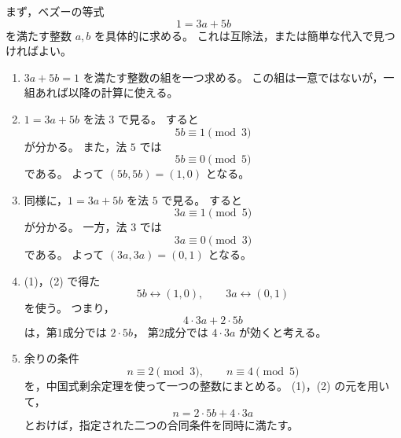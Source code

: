 \begin{strategy}
	まず，ベズーの等式
	\[
	1=3a+5b
	\]
	を満たす整数 \(a,b\) を具体的に求める。
	これは互除法，または簡単な代入で見つければよい。
	
	\begin{enumerate}
		\item[(0)]
		\(3a+5b=1\) を満たす整数の組を一つ求める。
		この組は一意ではないが，一組あれば以降の計算に使える。
		
		\item[(1)]
		\(1=3a+5b\) を法 \(3\) で見る。
		すると
		\[
		5b\equiv 1 \pmod{3}
		\]
		が分かる。
		また，法 \(5\) では
		\[
		5b\equiv 0 \pmod{5}
		\]
		である。
		よって \((5b,5b)=(1,0)\) となる。
		
		\item[(2)]
		同様に，\(1=3a+5b\) を法 \(5\) で見る。
		すると
		\[
		3a\equiv 1 \pmod{5}
		\]
		が分かる。
		一方，法 \(3\) では
		\[
		3a\equiv 0 \pmod{3}
		\]
		である。
		よって \((3a,3a)=(0,1)\) となる。
		
		\item[(3)]
		(1)，(2) で得た
		\[
		5b \leftrightarrow (1,0),
		\qquad
		3a \leftrightarrow (0,1)
		\]
		を使う。
		つまり，
		\[
		4\cdot 3a+2\cdot 5b
		\]
		は，第1成分では \(2\cdot 5b\)，
		第2成分では \(4\cdot 3a\) が効くと考える。
		
		\item[(4)]
		余りの条件
		\[
		n\equiv 2 \pmod{3},
		\qquad
		n\equiv 4 \pmod{5}
		\]
		を，中国式剰余定理を使って一つの整数にまとめる。
		(1)，(2) の元を用いて，
		\[
		n=2\cdot 5b+4\cdot 3a
		\]
		とおけば，指定された二つの合同条件を同時に満たす。
	\end{enumerate}
\end{strategy}